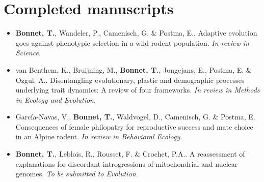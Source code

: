 \documentclass[a4paper,10pt]{article} %
\begin{document}
\section*{Completed manuscripts}
\vspace{10pt}
\begin{itemize}
\item \textbf{Bonnet, T.}, Wandeler, P., Camenisch, G. \& Postma, E.. Adaptive evolution goes against phenotypic selection in a wild rodent population. \textit{In review in Science}.
\item van Benthem, K., Bruijning, M., \textbf{Bonnet, T.}, Jongejans, E., Postma, E. \& Ozgul, A.. Disentangling evolutionary, plastic and demographic processes underlying trait dynamics: A review of four frameworks. \textit{In review in Methods in Ecology and Evolution}.
\item Garc\'{i}a-Navas, V., \textbf{Bonnet, T.}, Waldvogel, D., Camenisch, G. \& Postma, E. Consequences of female philopatry for reproductive success and mate choice in an Alpine rodent. \textit{In review in Behavioral Ecology}.
\item \textbf{Bonnet, T.}, Leblois, R., Rousset, F. \& Crochet, P.A.. A reassessment of explanations for discordant introgressions of mitochondrial and nuclear genomes. \textit{To be submitted to Evolution}.
\end{itemize}
\end{document}
